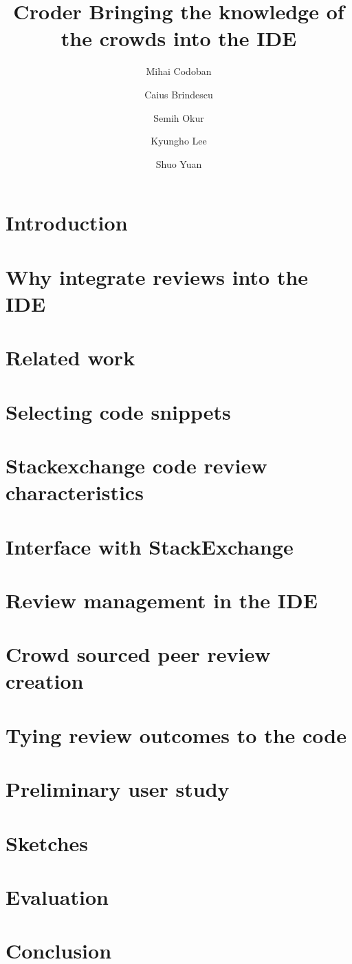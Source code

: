 \documentclass[10pt,letterpaper]{article}
\title{Croder Bringing the knowledge of the crowds into the IDE}
\author{Mihai Codoban \and Caius Brindescu \and Semih Okur \and Kyungho Lee \and Shuo Yuan}
\begin{document}
\section{Introduction}
\section{Why integrate reviews into the IDE}
\section{Related work}
\section{Selecting code snippets}
\section{Stackexchange code review characteristics}
\section{Interface with StackExchange}
\section{Review management in the IDE}
\section{Crowd sourced peer review creation}
\section{Tying review outcomes to the code}
\section{Preliminary user study}
\section{Sketches}
\section{Evaluation}
\section{Conclusion}
\end{document}
